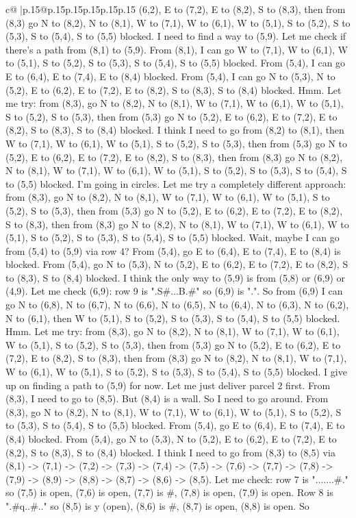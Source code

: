 \documentclass{article}
\begin{document}
{\begin{supertabular}{c@{$\;$}|p{.15\linewidth}@{}p{.15\linewidth}p{.15\linewidth}p{.15\linewidth}p{.15\linewidth}p{.15\linewidth}}
{{{(6,2), E to (7,2), E to (8,2), S to (8,3), then from (8,3) go N to (8,2), N to (8,1), W to (7,1), W to (6,1), W to (5,1), S to (5,2), S to (5,3), S to (5,4), S to (5,5) blocked. I need to find a way to (5,9). Let me check if there's a path from (8,1) to (5,9). From (8,1), I can go W to (7,1), W to (6,1), W to (5,1), S to (5,2), S to (5,3), S to (5,4), S to (5,5) blocked. From (5,4), I can go E to (6,4), E to (7,4), E to (8,4) blocked. From (5,4), I can go N to (5,3), N to (5,2), E to (6,2), E to (7,2), E to (8,2), S to (8,3), S to (8,4) blocked. Hmm. Let me try: from (8,3), go N to (8,2), N to (8,1), W to (7,1), W to (6,1), W to (5,1), S to (5,2), S to (5,3), then from (5,3) go N to (5,2), E to (6,2), E to (7,2), E to (8,2), S to (8,3), S to (8,4) blocked. I think I need to go from (8,2) to (8,1), then W to (7,1), W to (6,1), W to (5,1), S to (5,2), S to (5,3), then from (5,3) go N to (5,2), E to (6,2), E to (7,2), E to (8,2), S to (8,3), then from (8,3) go N to (8,2), N to (8,1), W to (7,1), W to (6,1), W to (5,1), S to (5,2), S to (5,3), S to (5,4), S to (5,5) blocked. I'm going in circles. Let me try a completely different approach: from (8,3), go N to (8,2), N to (8,1), W to (7,1), W to (6,1), W to (5,1), S to (5,2), S to (5,3), then from (5,3) go N to (5,2), E to (6,2), E to (7,2), E to (8,2), S to (8,3), then from (8,3) go N to (8,2), N to (8,1), W to (7,1), W to (6,1), W to (5,1), S to (5,2), S to (5,3), S to (5,4), S to (5,5) blocked. Wait, maybe I can go from (5,4) to (5,9) via row 4? From (5,4), go E to (6,4), E to (7,4), E to (8,4) is blocked. From (5,4), go N to (5,3), N to (5,2), E to (6,2), E to (7,2), E to (8,2), S to (8,3), S to (8,4) blocked. I think the only way to (5,9) is from (5,8) or (6,9) or (4,9). Let me check (6,9): row 9 is ".S\#...B.\#" so (6,9) is ".". So from (6,9) I can go N to (6,8), N to (6,7), N to (6,6), N to (6,5), N to (6,4), N to (6,3), N to (6,2), N to (6,1), then W to (5,1), S to (5,2), S to (5,3), S to (5,4), S to (5,5) blocked. Hmm. Let me try: from (8,3), go N to (8,2), N to (8,1), W to (7,1), W to (6,1), W to (5,1), S to (5,2), S to (5,3), then from (5,3) go N to (5,2), E to (6,2), E to (7,2), E to (8,2), S to (8,3), then from (8,3) go N to (8,2), N to (8,1), W to (7,1), W to (6,1), W to (5,1), S to (5,2), S to (5,3), S to (5,4), S to (5,5) blocked. I give up on finding a path to (5,9) for now. Let me just deliver parcel 2 first. From (8,3), I need to go to (8,5). But (8,4) is a wall. So I need to go around. From (8,3), go N to (8,2), N to (8,1), W to (7,1), W to (6,1), W to (5,1), S to (5,2), S to (5,3), S to (5,4), S to (5,5) blocked. From (5,4), go E to (6,4), E to (7,4), E to (8,4) blocked. From (5,4), go N to (5,3), N to (5,2), E to (6,2), E to (7,2), E to (8,2), S to (8,3), S to (8,4) blocked. I think I need to go from (8,3) to (8,5) via (8,1) {-}> (7,1) {-}> (7,2) {-}> (7,3) {-}> (7,4) {-}> (7,5) {-}> (7,6) {-}> (7,7) {-}> (7,8) {-}> (7,9) {-}> (8,9) {-}> (8,8) {-}> (8,7) {-}> (8,6) {-}> (8,5). Let me check: row 7 is ".......\#." so (7,5) is open, (7,6) is open, (7,7) is \#, (7,8) is open, (7,9) is open. Row 8 is ".\#q..\#.." so (8,5) is y (open), (8,6) is \#, (8,7) is open, (8,8) is open. So }}}
\end{supertabular}}
\end{document}
